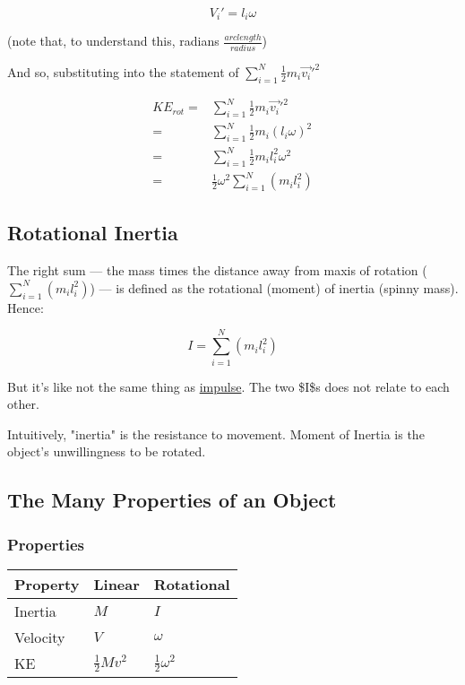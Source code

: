 \documentclass[letterpaper]{article}
\begin{document}
\begin{equation}
    V_i' = l_i \omega 
\end{equation}

(note that, to understand this, radians \(\frac{arc length}{radius}\))

And so, substituting into the statement of \(\sum^N_{i=1} \frac{1}{2}m_i\vec{v_i}'^2\)

\begin{align}
    KE_{rot} =& \sum^N_{i=1} \frac{1}{2}m_i\vec{v_i}'^2 \\
    =& \sum^N_{i=1} \frac{1}{2}m_i(l_i \omega)^2 \\
    =& \sum^N_{i=1} \frac{1}{2}m_i l_i^2 \omega^2 \\
    =& \frac{1}{2}\omega^2 \sum^N_{i=1} (m_i l_i^2)
\end{align}

\subsection{Rotational Inertia}
\label{sec:org0dc13a0}
The right sum --- the mass times the distance away from maxis of rotation (\(\sum^N_{i=1} (m_i l_i^2)\)) --- is defined as the rotational (moment) of inertia (spinny mass). Hence:

\begin{equation}
    I = \sum^N_{i=1} (m_i l_i^2)
\end{equation}

But it's like not the same thing as \href{KBhPHYS360Impulse.org}{impulse}. The two \$I\$s does not relate to each other.

Intuitively, "inertia" is the resistance to movement. Moment of Inertia is the object's unwillingness to be rotated.

\subsection{The Many Properties of an Object}
\label{sec:org3e3eb45}

\subsubsection{Properties}
\label{sec:org3dad5ce}
\begin{center}
\begin{tabular}{lll}
Property & Linear & Rotational\\
\hline
Inertia & \(M\) & \(I\)\\
Velocity & \(V\) & \(\omega\)\\
KE & \(\frac{1}{2}Mv^2\) & \(\frac{1}{2}\omega^2\)\\
\end{tabular}
\end{center}
\end{document}
